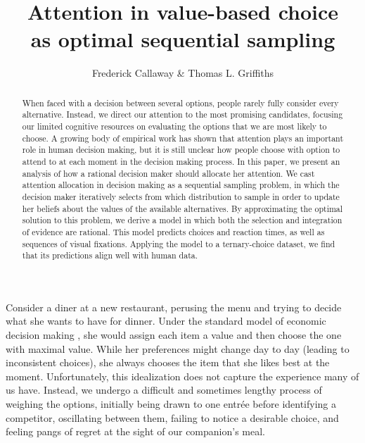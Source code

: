 \documentclass[12pt,a4paperpaper,]{article}
\title{\vspace{-2em}Attention in value-based choice\\
       as optimal sequential sampling}
\author{Frederick Callaway \& Thomas L. Griffiths}
\date{\vspace{-1em}}
\begin{document}
\maketitle

\begin{abstract}
  When faced with a decision between several options, people rarely fully consider every alternative. Instead, we direct our attention to the most promising candidates, focusing our limited cognitive resources on evaluating the options that we are most likely to choose. A growing body of empirical work has shown that attention plays an important role in human decision making, but it is still unclear how people choose with option to attend to at each moment in the decision making process. In this paper, we present an analysis of how a rational decision maker should allocate her attention. We cast attention allocation in decision making as a sequential sampling problem, in which the decision maker iteratively selects from which distribution to sample in order to update her beliefs about the values of the available alternatives. By approximating the optimal solution to this problem, we derive a model in which both the selection and integration of evidence are rational. This model predicts choices and reaction times, as well as sequences of visual fixations. Applying the model to a ternary-choice dataset, we find that its predictions align well with human data.
\end{abstract}



Consider a diner at a new restaurant, perusing the menu and trying to decide what she wants to have for dinner. Under the standard model of economic decision making \citep{Kahneman1979,Rangel2008}, she would assign each item a value and then choose the one with maximal value. While her preferences might change day to day (leading to inconsistent choices), she always chooses the item that she likes best at the moment. Unfortunately, this idealization does not capture the experience many of us have. Instead, we undergo a difficult and sometimes lengthy process of weighing the options, initially being drawn to one entr\'ee before identifying a competitor, oscillating between them, failing to notice a desirable choice, and feeling pangs of regret at the sight of our companion's meal.
\end{document}
